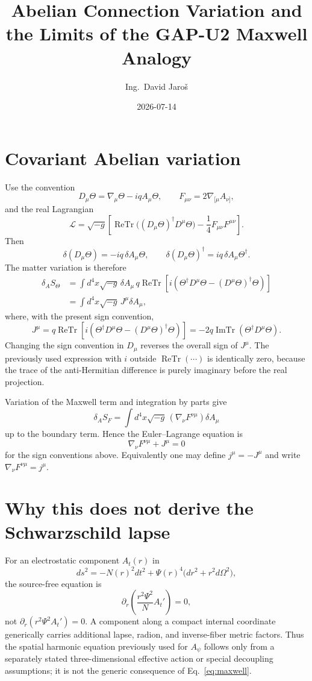 \documentclass[12pt,a4paper]{article}
\title{Abelian Connection Variation and the Limits of the GAP-U2 Maxwell Analogy}
\author{Ing.\ David Jaroš}
\date{2026-07-14}
\theoremstyle{remark}\newtheorem{remark}[theorem]{Remark}
\begin{document}
\maketitle
\fi

\section{Covariant Abelian variation}
Use the convention
\[
 D_\mu\Theta=\nabla_\mu\Theta-iqA_\mu\Theta,
 \qquad F_{\mu\nu}=2\nabla_{[\mu}A_{\nu]},
\]
and the real Lagrangian
\[
 \mathcal L=\sqrt{-g}\left[
 \operatorname{ReTr}\bigl((D_\mu\Theta)^\dagger D^\mu\Theta\bigr)
 -\frac14F_{\mu\nu}F^{\mu\nu}\right].
\]
Then
\[
 \delta(D_\mu\Theta)=-iq\,\delta A_\mu\Theta,
 \qquad
 \delta(D_\mu\Theta)^\dagger=iq\,\delta A_\mu\Theta^\dagger.
\]
The matter variation is therefore
\begin{align}
 \delta_A S_{\Theta}
 &=\int d^4x\sqrt{-g}\,\delta A_\mu\,
 q\operatorname{ReTr}\!\left[
 i\left(\Theta^\dagger D^\mu\Theta
 -(D^\mu\Theta)^\dagger\Theta\right)\right]\\
 &=\int d^4x\sqrt{-g}\,J^\mu\delta A_\mu,
\end{align}
where, with the present sign convention,
\begin{equation}
 \boxed{J^\mu
 =q\operatorname{ReTr}\!\left[
 i\left(\Theta^\dagger D^\mu\Theta
 -(D^\mu\Theta)^\dagger\Theta\right)\right]
 =-2q\operatorname{ImTr}(\Theta^\dagger D^\mu\Theta).}
 \label{eq:current}
\end{equation}
Changing the sign convention in $D_\mu$ reverses the overall sign of $J^\mu$.
The previously used expression with $i$ outside
$\operatorname{ReTr}(\cdots)$ is identically zero, because the trace of the
anti-Hermitian difference is purely imaginary before the real projection.

Variation of the Maxwell term and integration by parts give
\[
 \delta_A S_F=\int d^4x\sqrt{-g}\,
 (\nabla_\nu F^{\nu\mu})\delta A_\mu
\]
up to the boundary term.  Hence the Euler--Lagrange equation is
\begin{equation}
 \boxed{\nabla_\nu F^{\nu\mu}+J^\mu=0}
 \label{eq:maxwell}
\end{equation}
for the sign conventions above.  Equivalently one may define
$j^\mu=-J^\mu$ and write $\nabla_\nu F^{\nu\mu}=j^\mu$.

\section{Why this does not derive the Schwarzschild lapse}
For an electrostatic component $A_t(r)$ in
\[
 ds^2=-N(r)^2dt^2+\Psi(r)^4\bigl(dr^2+r^2d\Omega^2\bigr),
\]
the source-free equation is
\[
 \partial_r\!\left(\frac{r^2\Psi^2}{N}A_t'\right)=0,
\]
not $\partial_r(r^2\Psi^2A_t')=0$.  A component along a compact internal
coordinate generically carries additional lapse, radion, and inverse-fiber
metric factors.  Thus the spatial harmonic equation previously used for
$A_\psi$ follows only from a separately stated three-dimensional effective
action or special decoupling assumptions; it is not the generic consequence
of Eq.~\eqref{eq:maxwell}.
\end{document}
